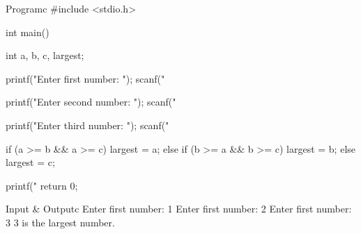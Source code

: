 \documentclass[11pt]{ipu-c}
\begin{document}
    \newpage
    \begin{code}
        {Program}{c}
#include <stdio.h>

int main() {
    int a, b, c, largest;

    printf("Enter first number: ");
    scanf("%

    printf("Enter second number: ");
    scanf("%

    printf("Enter third number: ");
    scanf("%

    if (a >= b && a >= c) {
        largest = a;
    } else if (b >= a && b >= c) {
        largest = b;
    } else {
        largest = c;
    }

    printf("%
    return 0;
}
    \end{code}
    \begin{code}
        {Input \& Output}{c}
Enter first number: 1
Enter first number: 2
Enter first number: 3
3 is the largest number.
    \end{code}
\end{document}
